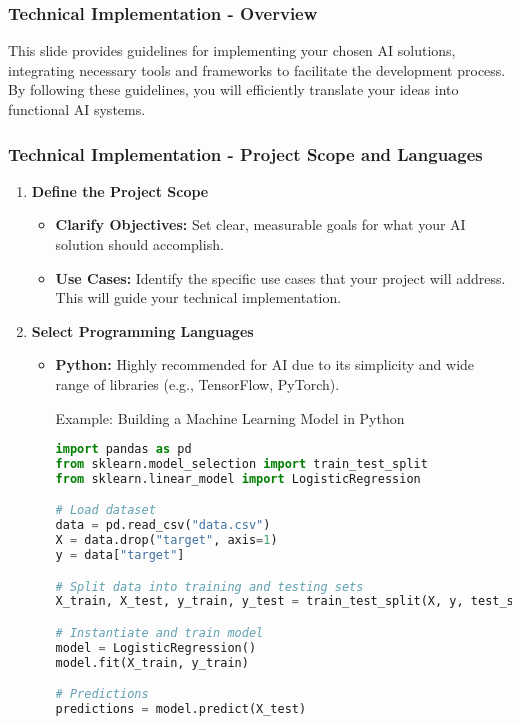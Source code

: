 \documentclass[aspectratio=169]{beamer}
\begin{document}
\begin{frame}[fragile]
    \frametitle{Technical Implementation - Overview}
    This slide provides guidelines for implementing your chosen AI solutions, integrating necessary tools and frameworks to facilitate the development process. By following these guidelines, you will efficiently translate your ideas into functional AI systems.
\end{frame}

\begin{frame}[fragile]
    \frametitle{Technical Implementation - Project Scope and Languages}
    \begin{enumerate}
        \item \textbf{Define the Project Scope}
        \begin{itemize}
            \item \textbf{Clarify Objectives:} Set clear, measurable goals for what your AI solution should accomplish.
            \item \textbf{Use Cases:} Identify the specific use cases that your project will address. This will guide your technical implementation.
        \end{itemize}
        
        \item \textbf{Select Programming Languages}
        \begin{itemize}
            \item \textbf{Python:} Highly recommended for AI due to its simplicity and wide range of libraries (e.g., TensorFlow, PyTorch).
            \begin{block}{Example: Building a Machine Learning Model in Python}
            \begin{lstlisting}[language=Python]
import pandas as pd
from sklearn.model_selection import train_test_split
from sklearn.linear_model import LogisticRegression

# Load dataset
data = pd.read_csv("data.csv")
X = data.drop("target", axis=1)
y = data["target"]

# Split data into training and testing sets
X_train, X_test, y_train, y_test = train_test_split(X, y, test_size=0.2)

# Instantiate and train model
model = LogisticRegression()
model.fit(X_train, y_train)

# Predictions
predictions = model.predict(X_test)
            \end{lstlisting}
            \end{block}
        \end{itemize}
    \end{enumerate}
\end{frame}
\end{document}
